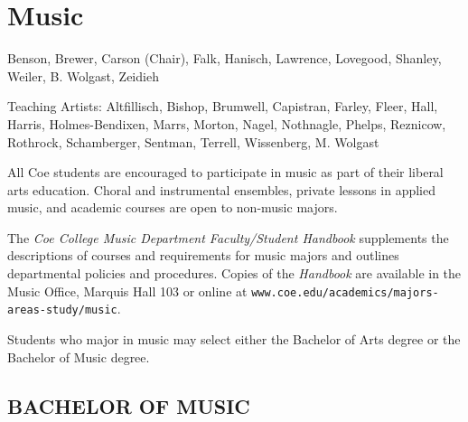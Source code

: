 \documentclass[
  letterpaper,
]{scrbook}
\begin{document}
\hypertarget{sec-music}{%
\section{Music}\label{sec-music}}

Benson, Brewer, Carson (Chair), Falk, Hanisch, Lawrence, Lovegood,
Shanley, Weiler, B. Wolgast, Zeidieh

Teaching Artists: Altfillisch, Bishop, Brumwell, Capistran, Farley,
Fleer, Hall, Harris, Holmes-Bendixen, Marrs, Morton, Nagel, Nothnagle,
Phelps, Reznicow, Rothrock, Schamberger, Sentman, Terrell, Wissenberg,
M. Wolgast

All Coe students are encouraged to participate in music as part of their
liberal arts education. Choral and instrumental ensembles, private
lessons in applied music, and academic courses are open to non-music
majors.

The \emph{Coe College Music Department Faculty/Student Handbook}
supplements the descriptions of courses and requirements for music
majors and outlines departmental policies and procedures. Copies of the
\emph{Handbook} are available in the Music Office, Marquis Hall 103 or
online at \texttt{www.coe.edu/academics/majors-areas-study/music}.

Students who major in music may select either the Bachelor of Arts
degree or the Bachelor of Music degree.

\hypertarget{bachelor-of-music}{%
\subsection{BACHELOR OF MUSIC}\label{bachelor-of-music}}
\end{document}
